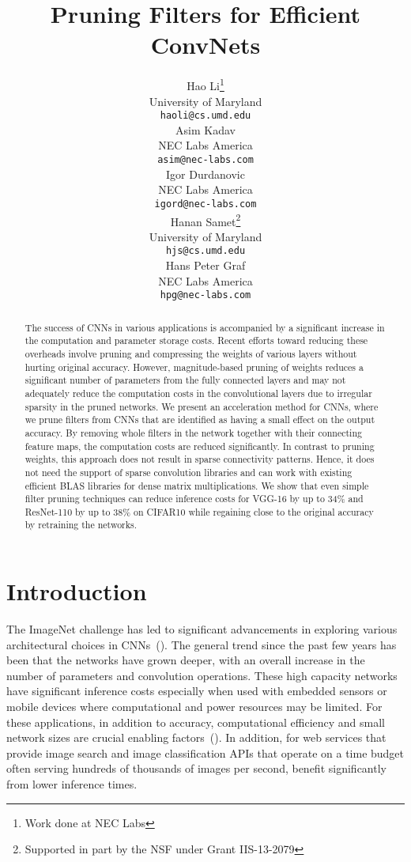 \documentclass{article} \usepackage{iclr2017_conference,times}
\title{Pruning Filters for Efficient ConvNets}
\author{Hao Li\thanks{Work done at NEC Labs}\\  
  University of Maryland\\  
  \texttt{haoli@cs.umd.edu} \\
  \And
  Asim Kadav \\
  NEC Labs America \\
  \texttt{asim@nec-labs.com} \\
  \And
  Igor Durdanovic \\
  NEC Labs America \\
  \texttt{igord@nec-labs.com} \\
  \And
  Hanan Samet\thanks{Supported in part by the NSF under Grant IIS-13-2079} \\
  University of Maryland\\
  \texttt{hjs@cs.umd.edu} \\
  \And
  Hans Peter Graf \\
  NEC Labs America \\
  \texttt{hpg@nec-labs.com} \\
}
\begin{document}
\maketitle

\begin{abstract}

The success of CNNs in various applications is accompanied by a significant increase in the computation and parameter storage costs. 
Recent efforts toward reducing these overheads involve pruning and compressing the weights of various layers without hurting original accuracy. 
However, magnitude-based pruning of weights reduces a significant number of parameters from the fully connected layers and may not adequately reduce the computation costs in the convolutional layers due to irregular sparsity in the pruned networks.
We present an acceleration method for CNNs, where we prune filters from CNNs that are identified as having a small effect on the output accuracy. 
By removing whole filters in the network together with their connecting feature maps, the computation costs are reduced significantly.
In contrast to pruning weights, this approach does not result in sparse connectivity patterns. 
Hence, it does not need the support of sparse convolution libraries and can work with existing efficient BLAS libraries for dense matrix multiplications. 
We show that even simple filter pruning techniques can reduce inference costs for VGG-16 by up to 34\% and ResNet-110 by up to 38\% on CIFAR10 while regaining close to the original accuracy by retraining the networks.  

\end{abstract} \section{Introduction}


The ImageNet challenge has led to significant advancements in exploring various architectural choices in CNNs~(\cite{ILSVRC15,alexnet,vgg,googlenet,resnet}). 
The general trend since the past few years has been that the networks have grown deeper, with an overall increase in the number of parameters and convolution operations. 
These high capacity networks have significant inference costs especially when used with embedded sensors or mobile devices where computational and power resources may be limited.
For these applications, in addition to accuracy, computational efficiency and small network sizes are crucial enabling factors~(\cite{inceptionv3}).
In addition, for web services that provide image search and image classification APIs that operate on a time budget often serving hundreds of thousands of images per second, benefit significantly from lower inference times.
\end{document}
